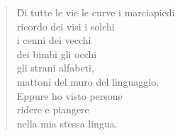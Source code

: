 
\begin{verse}
    Di tutte le vie le curve i marciapiedi\\
    ricordo dei visi i solchi\\
    i cenni dei vecchi\\
    dei bimbi gli occhi\\
    gli strani alfabeti,\\
    mattoni del muro del linguaggio.\\

    Eppure ho visto persone\\
    ridere e piangere\\
    nella mia stessa lingua.
\end{verse}